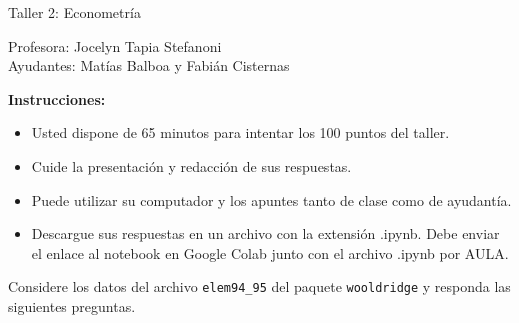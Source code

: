 \documentclass[letterpaper,11pt]{article}
\begin{document}
\begin{center}
    {\Large  Taller 2: Econometría }

Profesora:    Jocelyn Tapia Stefanoni\\
Ayudantes:   Matías Balboa y   Fabián Cisternas
\end{center}

\textbf{Instrucciones:} 

\begin{itemize}
    \item Usted dispone de 65 minutos  para intentar los 100 puntos del taller.
    \item Cuide la presentación y redacción de sus respuestas.
    \item Puede utilizar su computador y los apuntes tanto de clase como de ayudantía.
\item Descargue sus respuestas en un archivo con la extensión .ipynb. Debe enviar el enlace al notebook en Google Colab junto con el archivo .ipynb por AULA. 
    \end{itemize}


Considere los datos del archivo \texttt{elem94\_95} del paquete \texttt{wooldridge} y responda las siguientes preguntas. 
 
\end{document}
